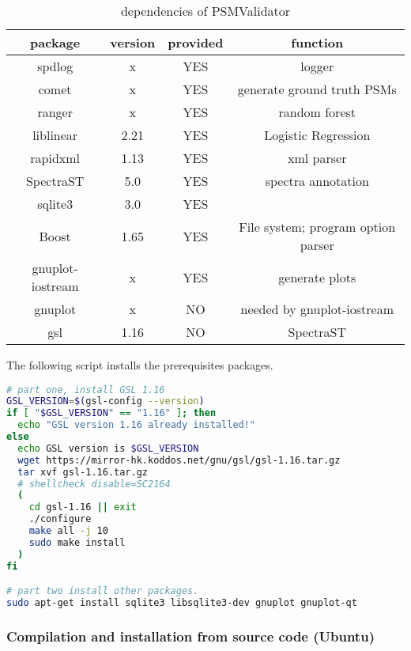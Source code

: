 \documentclass{ctexart}
\begin{document}
\begin{table}
  \caption{\label{tab:dependencies}dependencies of PSMValidator}
  {
    \begin{tabular}{|c|c|c|c|}
      \hline
      package&version&provided&function \\ 
      \hline
      spdlog&x&YES&logger\\
      comet&x&YES&  generate ground truth PSMs\\
      ranger&x&YES&  random forest\\
      liblinear&2.21&YES& Logistic Regression \\
      rapidxml&1.13&YES&  xml parser\\
      SpectraST&5.0&YES&spectra annotation\\
      sqlite3&3.0&YES&\\
      Boost&1.65&YES&File system; program option parser\\
      gnuplot-iostream&x&YES&generate plots\\
      gnuplot&x&NO&needed by gnuplot-iostream\\
      gsl&1.16&NO&SpectraST \\
      \hline
    \end{tabular}
    }

  \end{table}
    
    The following script installs the prerequisites packages.
    
\begin{lstlisting}[language=bash,caption=install GSL v1.16 and other dependencies]
# part one, install GSL 1.16
GSL_VERSION=$(gsl-config --version)
if [ "$GSL_VERSION" == "1.16" ]; then
  echo "GSL version 1.16 already installed!"
else
  echo GSL version is $GSL_VERSION
  wget https://mirror-hk.koddos.net/gnu/gsl/gsl-1.16.tar.gz
  tar xvf gsl-1.16.tar.gz
  # shellcheck disable=SC2164
  (
    cd gsl-1.16 || exit
    ./configure
    make all -j 10
    sudo make install
  )
fi

# part two install other packages.
sudo apt-get install sqlite3 libsqlite3-dev gnuplot gnuplot-qt
\end{lstlisting}

 

\subsubsection{ Compilation and installation from source code (Ubuntu)}
\end{document}
